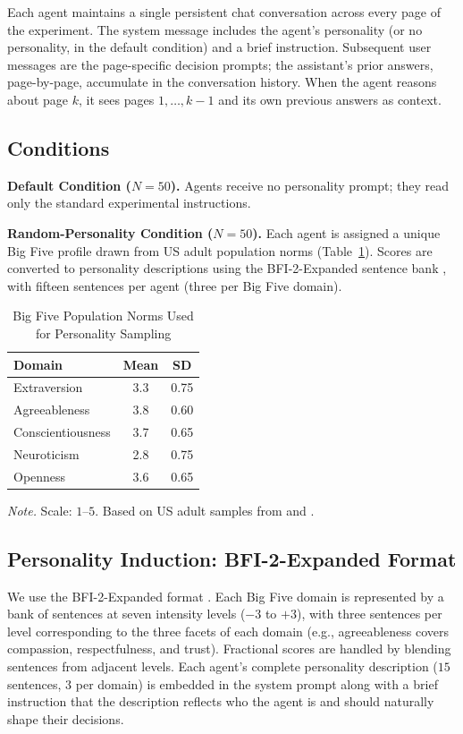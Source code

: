 \documentclass[12pt, a4paper]{article}
\begin{document}
Each agent maintains a single persistent chat conversation across every page of the experiment. The system message includes the agent's personality (or no personality, in the default condition) and a brief instruction. Subsequent user messages are the page-specific decision prompts; the assistant's prior answers, page-by-page, accumulate in the conversation history. When the agent reasons about page $k$, it sees pages $1, \ldots, k-1$ and its own previous answers as context.

\subsection{Conditions}

\textbf{Default Condition ($N=50$).} Agents receive no personality prompt; they read only the standard experimental instructions.

\textbf{Random-Personality Condition ($N=50$).} Each agent is assigned a unique Big Five profile drawn from US adult population norms (Table~\ref{tab:norms}). Scores are converted to personality descriptions using the BFI-2-Expanded sentence bank \citep{soto2017bfi2}, with fifteen sentences per agent (three per Big Five domain).

\begin{table}[H]
\centering
\caption{Big Five Population Norms Used for Personality Sampling}
\label{tab:norms}
\begin{tabular}{lcc}
\toprule
Domain & Mean & SD \\
\midrule
Extraversion      & 3.3 & 0.75 \\
Agreeableness     & 3.8 & 0.60 \\
Conscientiousness & 3.7 & 0.65 \\
Neuroticism       & 2.8 & 0.75 \\
Openness          & 3.6 & 0.65 \\
\bottomrule
\end{tabular}

\medskip
\footnotesize
\textit{Note.} Scale: $1$--$5$. Based on US adult samples from \citet{soto2017bfi2} and \citet{srivastava2003development}.
\end{table}

\subsection{Personality Induction: BFI-2-Expanded Format}

We use the BFI-2-Expanded format \citep{soto2017bfi2}. Each Big Five domain is represented by a bank of sentences at seven intensity levels ($-3$ to $+3$), with three sentences per level corresponding to the three facets of each domain (e.g., agreeableness covers compassion, respectfulness, and trust). Fractional scores are handled by blending sentences from adjacent levels. Each agent's complete personality description ($15$ sentences, $3$ per domain) is embedded in the system prompt along with a brief instruction that the description reflects who the agent is and should naturally shape their decisions.
\end{document}
